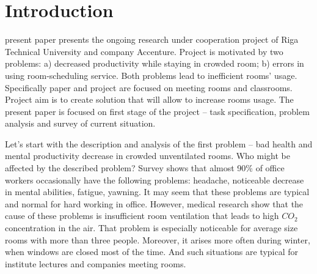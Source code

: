 \documentclass[journal]{IEEEtran}
\begin{document}
\section{Introduction}
% 
% 
% 
% 
%
% 
%
%
%

 present paper presents the ongoing research under cooperation project of Riga Technical University and company Accenture. Project is motivated by two problems: a) decreased productivity while staying in crowded room; b) errors in using room-scheduling service. Both problems lead to inefficient rooms’ usage. Specifically paper and project are focused on meeting rooms and classrooms. Project aim is to create solution that will allow to increase rooms usage. The present paper is focused on first stage of the project – task specification, problem analysis and survey of current situation.

Let’s start with the description and analysis of the first problem – bad health and mental productivity decrease in crowded unventilated rooms. Who might be affected by the described problem? Survey shows that almost 90\% of office workers occasionally have the following problems: headache, noticeable decrease in mental abilities, fatigue, yawning. It may seem that these problems are typical and normal for hard working in office. However, medical research \cite{Usha} show that the cause of these problems is insufficient room ventilation that leads to high $CO_2$ concentration in the air. That problem is especially noticeable for average size rooms with more than three people. Moreover, it arises more often during winter, when windows are closed most of the time. And such situations are typical for institute lectures and companies meeting rooms.
\end{document}
